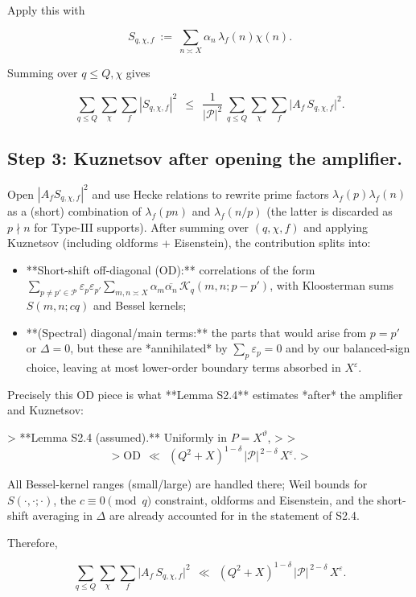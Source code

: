 \documentclass[11pt]{article}
\theoremstyle{definition}
\theoremstyle{remark}
\begin{document}
Apply this with

$$
S_{q,\chi,f}\ :=\ \sum_{n\asymp X}\alpha_n\,\lambda_f(n)\chi(n).
$$

Summing over $q\le Q,\chi$ gives

\begin{equation}
\sum_{q\le Q}\sum_{\chi}\sum_f |S_{q,\chi,f}|^2
\ \ \le\ \ \frac{1}{|\mathcal P|^2}\,
\sum_{q\le Q}\sum_{\chi}\sum_f \big|A_f\,S_{q,\chi,f}\big|^2.
\tag{3.1}
\end{equation}

\subsection*{Step 3: Kuznetsov after opening the amplifier.}
Open $|A_f S_{q,\chi,f}|^2$ and use Hecke relations to rewrite prime factors $\lambda_f(p)\lambda_f(n)$ as a (short) combination of $\lambda_f(pn)$ and $\lambda_f(n/p)$ (the latter is discarded as $p\nmid n$ for Type-III supports). After summing over $(q,\chi,f)$ and applying Kuznetsov (including oldforms + Eisenstein), the contribution splits into:

\begin{itemize}
\item **Short-shift off-diagonal (OD):** correlations of the form
  $\sum_{p\neq p'\in\mathcal P}\varepsilon_p\varepsilon_{p'}\sum_{m,n\asymp X}\alpha_m\overline{\alpha_n}\, \mathcal{K}_{q}(m, n; p-p')$,
  with Kloosterman sums $S(m,n;cq)$ and Bessel kernels;
\item **(Spectral) diagonal/main terms:** the parts that would arise from $p=p'$ or $\Delta=0$, but these are *annihilated* by $\sum_p\varepsilon_p=0$ and by our balanced-sign choice, leaving at most lower-order boundary terms absorbed in $X^{\varepsilon}$.
\end{itemize}

Precisely this OD piece is what **Lemma S2.4** estimates *after* the amplifier and Kuznetsov:

> **Lemma S2.4 (assumed).** Uniformly in $P=X^\vartheta$,
>
> $$
> \mathrm{OD}\ \ \ll\ \ (Q^2+X)^{1-\delta}\,|\mathcal P|^{\,2-\delta}\,X^{\varepsilon}.
> $$

All Bessel-kernel ranges (small/large) are handled there; Weil bounds for $S(\cdot,\cdot;\cdot)$, the $c\equiv0\pmod q$ constraint, oldforms and Eisenstein, and the short-shift averaging in $\Delta$ are already accounted for in the statement of S2.4.

Therefore,

\begin{equation}
\sum_{q\le Q}\sum_{\chi}\sum_f \big|A_f\,S_{q,\chi,f}\big|^2
\ \ \ll\ \ (Q^2+X)^{1-\delta}\,|\mathcal P|^{\,2-\delta}\,X^{\varepsilon}.
\tag{3.2}
\end{equation}
\end{document}
